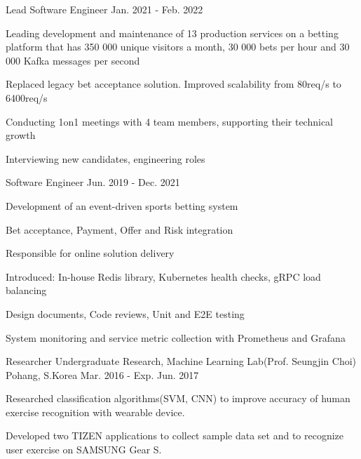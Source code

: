 \begin{cventries}
  \cventry
    {Lead Software Engineer} %
    {} %
    {} %
    {Jan. 2021 - Feb. 2022} %
    {
      \begin{cvitems} %
        \item {Leading development and maintenance of 13 production services on a betting platform that has 350 000 unique visitors a month, 30 000 bets per hour and 30 000 Kafka messages per second}
        \item {Replaced legacy bet acceptance solution. Improved scalability from 80req/s to 6400req/s}
        \item {Conducting 1on1 meetings with 4 team members, supporting their technical growth}
        \item {Interviewing new candidates, engineering roles}
      \end{cvitems}
    }

  \cventry
    {Software Engineer} %
    {} %
    {} %
    {Jun. 2019 - Dec. 2021} %
    {
      \begin{cvitems} %
        \item {Development of an event-driven sports betting system}
        \item {Bet acceptance, Payment, Offer and Risk integration}
        \item {Responsible for online solution delivery}
        \item {Introduced: In-house Redis library, Kubernetes health checks, gRPC load balancing}
        \item {Design documents, Code reviews, Unit and E2E testing}
        \item {System monitoring and service metric collection with Prometheus and Grafana}
      \end{cvitems}
    }

  \cventry
    {Researcher} %
    {Undergraduate Research, Machine Learning Lab(Prof. Seungjin Choi)} %
    {Pohang, S.Korea} %
    {Mar. 2016 - Exp. Jun. 2017} %
    {
      \begin{cvitems} %
        \item {Researched classification algorithms(SVM, CNN) to improve accuracy of human exercise recognition with wearable device.}
        \item {Developed two TIZEN applications to collect sample data set and to recognize user exercise on SAMSUNG Gear S.}
      \end{cvitems}
    }


\end{cventries}
